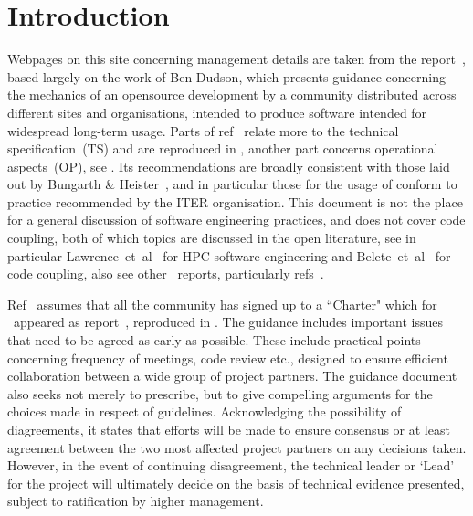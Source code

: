\section{Introduction}\label{sec:MGT_intro}
Webpages on this site concerning management details are taken from the
report~\cite{y3re314}, based largely on the work of Ben Dudson, which
presents guidance concerning the mechanics of an opensource development
by a community distributed  across different sites and organisations,
intended to produce software intended for widespread long-term usage.
Parts of ref~\cite{y3re314} relate more to 
the technical specification~(TS) and are reproduced in ,
another part concerns operational aspects~(OP), see .
Its recommendations are broadly consistent with those laid out by Bungarth \&
Heister~\cite{Ba13What}, and in particular those for the usage of 
conform to practice recommended by the ITER organisation.
This document is not the place for a general discussion of software engineering practices,
and does not cover code coupling, both of which topics are discussed in the open literature,
see in particular Lawrence~et~al~\cite{La18Cros} for HPC software engineering and
Belete~et~al~\cite{Be17over} for code coupling,
also see other \nep \ reports, particularly refs~\cite{y2re312,y2re333,y3re72}.

Ref~\cite{y3re314} assumes that all the community has signed up to a ``Charter"
which for \nep \ appeared as report~\cite{charter}, reproduced in .
The guidance\cite{y3re314}  includes  important issues that need to be agreed as early as possible.
These include practical points concerning frequency of meetings, code review etc.,
designed to ensure efficient collaboration between a wide group of project partners. 
The guidance document\cite{y3re314} also seeks not merely to prescribe, but to
give compelling arguments for the choices made in respect of guidelines.
Acknowledging the possibility of diagreements, it states that efforts will be made to ensure
consensus or at least agreement between the two most affected project partners
on any decisions taken. However, in the event of continuing disagreement, the technical
leader or `Lead' for the project will ultimately decide on the basis of technical
evidence presented, subject to ratification by higher management.

